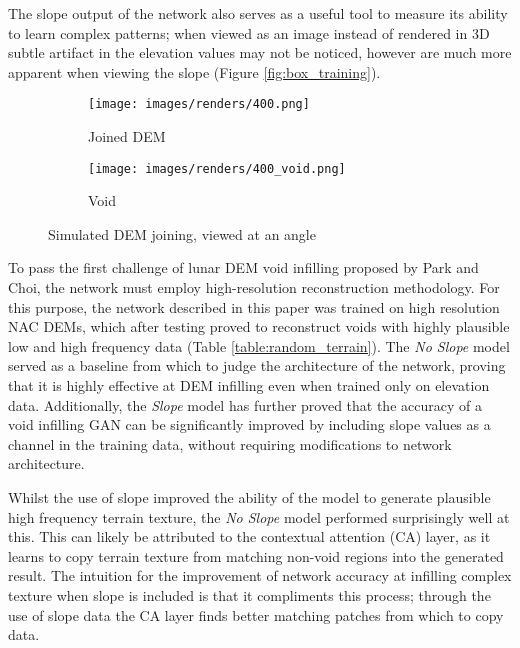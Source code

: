 \documentclass[twocolumn]{article}
\begin{document}
The slope output of the network also serves as a useful tool to measure its ability to learn complex patterns; when viewed as an image instead of rendered in 3D subtle artifact in the elevation values may not be noticed, however are much more apparent when viewing the slope (Figure \ref{fig:box_training}).

\begin{figure}
\centering
\begin{subfigure}{1\columnwidth}
  \caption{Joined DEM}
  \texttt{[image: images/renders/400.png]}
  \label{fig:400}
\end{subfigure}
\hfill
\begin{subfigure}{1\columnwidth}
  \caption{Void}
  \texttt{[image: images/renders/400\_void.png]}
  \label{fig:400_void}
\end{subfigure}
\caption{Simulated DEM joining, viewed at an angle}
\label{fig:simulated_joining}
\end{figure}

To pass the first challenge of lunar DEM void infilling proposed by Park and Choi\autocite{parkNeuralProcessApproach2021}, the network must employ high-resolution reconstruction methodology.
For this purpose, the network described in this paper was trained on high resolution NAC DEMs, which after testing proved to reconstruct voids with highly plausible low and high frequency data (Table \ref{table:random_terrain}).
The \emph{No Slope} model served as a baseline from which to judge the architecture of the network, proving that it is highly effective at DEM infilling even when trained only on elevation data.
Additionally, the \emph{Slope} model has further proved that the accuracy of a void infilling GAN can be significantly improved by including slope values as a channel in the training data, without requiring modifications to network architecture.

Whilst the use of slope improved the ability of the model to generate plausible high frequency terrain texture, the \emph{No Slope} model performed surprisingly well at this.
This can likely be attributed to the contextual attention (CA) layer, as it learns to copy terrain texture from matching non-void regions into the generated result.
The intuition for the improvement of network accuracy at infilling complex texture when slope is included is that it compliments this process; through the use of slope data the CA layer finds better matching patches from which to copy data.
\end{document}
